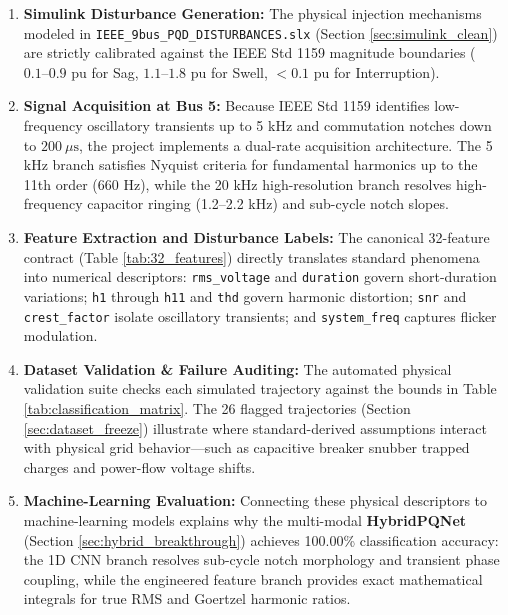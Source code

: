 \documentclass[12pt,a4paper]{report}
\begin{document}
\begin{enumerate}
    \item \textbf{Simulink Disturbance Generation:} The physical injection mechanisms modeled in \texttt{IEEE\_9bus\_PQD\_DISTURBANCES.slx} (Section \ref{sec:simulink_clean}) are strictly calibrated against the IEEE Std 1159 magnitude boundaries ($0.1\text{--}0.9\text{ pu}$ for Sag, $1.1\text{--}1.8\text{ pu}$ for Swell, $<0.1\text{ pu}$ for Interruption).
    \item \textbf{Signal Acquisition at Bus 5:} Because IEEE Std 1159 identifies low-frequency oscillatory transients up to 5 kHz and commutation notches down to $200\ \mu\text{s}$, the project implements a dual-rate acquisition architecture. The 5 kHz branch satisfies Nyquist criteria for fundamental harmonics up to the 11th order (660 Hz), while the 20 kHz high-resolution branch resolves high-frequency capacitor ringing (1.2--2.2 kHz) and sub-cycle notch slopes.
    \item \textbf{Feature Extraction and Disturbance Labels:} The canonical 32-feature contract (Table \ref{tab:32_features}) directly translates standard phenomena into numerical descriptors: \texttt{rms\_voltage} and \texttt{duration} govern short-duration variations; \texttt{h1} through \texttt{h11} and \texttt{thd} govern harmonic distortion; \texttt{snr} and \texttt{crest\_factor} isolate oscillatory transients; and \texttt{system\_freq} captures flicker modulation.
    \item \textbf{Dataset Validation \& Failure Auditing:} The automated physical validation suite checks each simulated trajectory against the bounds in Table \ref{tab:classification_matrix}. The 26 flagged trajectories (Section \ref{sec:dataset_freeze}) illustrate where standard-derived assumptions interact with physical grid behavior---such as capacitive breaker snubber trapped charges and power-flow voltage shifts.
    \item \textbf{Machine-Learning Evaluation:} Connecting these physical descriptors to machine-learning models explains why the multi-modal \textbf{HybridPQNet} (Section \ref{sec:hybrid_breakthrough}) achieves 100.00\% classification accuracy: the 1D CNN branch resolves sub-cycle notch morphology and transient phase coupling, while the engineered feature branch provides exact mathematical integrals for true RMS and Goertzel harmonic ratios.
\end{enumerate}

\end{document}
